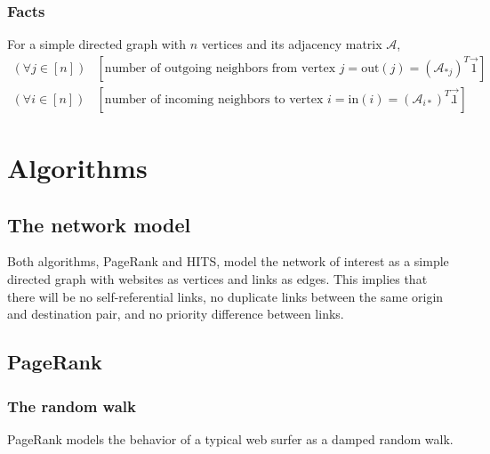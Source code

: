 \documentclass[12pt, titlepage, twoside]{amsart}
\begin{document}
\subsubsection{Facts}

For a simple directed graph with $n$ vertices and its adjacency matrix $\mathcal{A}$,
\begin{align*}
  (\forall j\in[n])&
  \left[\text{number of outgoing neighbors from vertex $j$} = \mathrm{out}(j) = (\mathcal{A}_{*j})^T\vec{1}\right] \\
  (\forall i\in[n])&
  \left[\text{number of incoming neighbors to vertex $i$} = \mathrm{in}(i) = (\mathcal{A}_{i*})^T\vec{1}\right].
\end{align*}

\section{Algorithms}

\subsection{The network model}

Both algorithms, PageRank and HITS, model the network of interest as a simple directed graph with websites as vertices
and links as edges.
This implies that there will be no self-referential links, no duplicate links between the same origin
and destination pair, and no priority difference between links.

\subsection{PageRank}

\subsubsection{The random walk}

PageRank models the behavior of a typical web surfer as a damped random walk.
\end{document}
